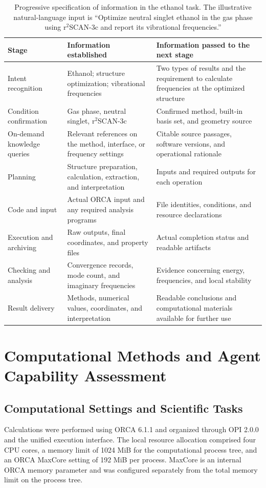 \documentclass[a4paper,11pt]{article}
\begin{document}
\begin{table}[htbp]
  \centering\small
  \caption{Progressive specification of information in the ethanol task.
  The illustrative natural-language input is ``Optimize neutral singlet ethanol in the gas phase using r$^{2}$SCAN-3c and report its vibrational frequencies.''}
  \label{tab:workflow-example}
  \begin{tabularx}{\linewidth}{>{\raggedright\arraybackslash}p{2.35cm}YY}
    \toprule
    Stage & Information established & Information passed to the next stage\\
    \midrule
    Intent recognition & Ethanol; structure optimization; vibrational frequencies & Two types of results and the requirement to calculate frequencies at the optimized structure\\
    Condition confirmation & Gas phase, neutral singlet, r$^{2}$SCAN-3c & Confirmed method, built-in basis set, and geometry source\\
    On-demand knowledge queries & Relevant references on the method, interface, or frequency settings & Citable source passages, software versions, and operational rationale\\
    Planning & Structure preparation, calculation, extraction, and interpretation & Inputs and required outputs for each operation\\
    Code and input & Actual ORCA input and any required analysis programs & File identities, conditions, and resource declarations\\
    Execution and archiving & Raw outputs, final coordinates, and property files & Actual completion status and readable artifacts\\
    Checking and analysis & Convergence records, mode count, and imaginary frequencies & Evidence concerning energy, frequencies, and local stability\\
    Result delivery & Methods, numerical values, coordinates, and interpretation & Readable conclusions and computational materials available for further use\\
    \bottomrule
  \end{tabularx}
\end{table}

\section{Computational Methods and Agent Capability Assessment}
\subsection{Computational Settings and Scientific Tasks}
Calculations were performed using ORCA 6.1.1 and organized through OPI 2.0.0 and the unified execution interface.
The local resource allocation comprised four CPU cores, a memory limit of 1024 MiB for the computational process tree,
and an ORCA MaxCore setting of 192 MiB per process.
MaxCore is an internal ORCA memory parameter and was configured separately from the total memory limit on the process tree.
\end{document}
